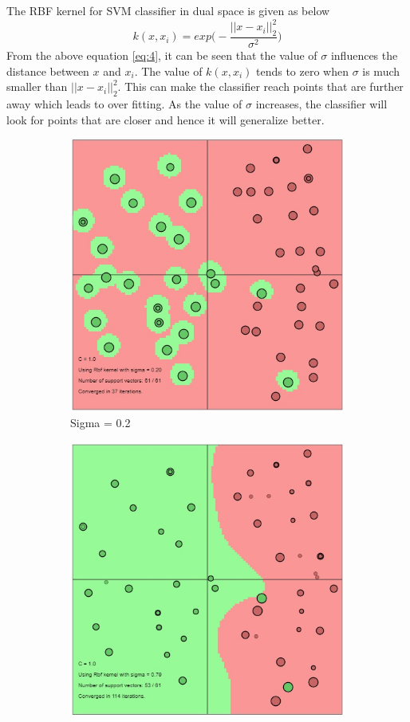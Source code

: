 {The RBF kernel for SVM classifier in dual space is given as below
\begin{equation}\label{eq:4}
	k(x,x_i)= exp{\Bigg(-\dfrac{||x-x_i||^2_2}{\sigma^2} \Bigg)}
\end{equation}
From the above equation \ref{eq:4}, it can be seen that the value of $\sigma$ influences the distance between $x$ and $x_i$. The value of $k(x,x_i)$ tends to zero when $\sigma$ is much smaller than $||x-x_i||^2_2$. This can make the classifier reach points that are further away which leads to over fitting. As the value of $\sigma$ increases, the classifier will look for points that are closer and hence it will generalize better.\\
\begin{figure}[!ht] 
	\centering
	\begin{subfigure}{.255\textwidth}
		\centering
		\includegraphics[width=0.8\linewidth]{Exercise1/Report/RBF_sigma(0.2).jpg}
		\caption{Sigma = 0.2}
		\label{fig:RBF_sig0.2}
	\end{subfigure}%
	\begin{subfigure}{.255\textwidth}
		\centering
		\includegraphics[width=0.8\linewidth]{Exercise1/Report/RBF_sigma(0.79).jpg}

\end{subfigure}
\end{figure}}
